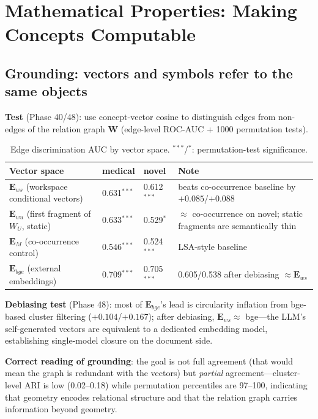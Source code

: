 \section{Mathematical Properties: Making Concepts Computable}
\label{sec:math}

\subsection{Grounding: vectors and symbols refer to the same objects}
\label{sec:math:grounding}

\textbf{Test} (Phase 40/48): use concept-vector cosine to distinguish edges
from non-edges of the relation graph $\mathbf{W}$ (edge-level ROC-AUC + 1000
permutation tests).

\begin{table}[t]
\centering
\caption{Edge discrimination AUC by vector space. $^{***}$/$^{*}$: permutation-test significance.}
\label{tab:grounding}
\begin{tabular}{@{}llll@{}}
\toprule
Vector space & medical & novel & Note \\
\midrule
$\mathbf{E}_{ws}$ (workspace conditional vectors) & 0.631$^{***}$ & 0.612$^{***}$ & beats co-occurrence baseline by $+0.085$/$+0.088$ \\
$\mathbf{E}_{wu}$ (first fragment of $W_U$, static) & 0.633$^{***}$ & 0.529$^{*}$ & $\approx$ co-occurrence on novel; static fragments are semantically thin \\
$\mathbf{E}_{M}$ (co-occurrence control) & 0.546$^{***}$ & 0.524$^{***}$ & LSA-style baseline \\
$\mathbf{E}_{bge}$ (external embeddings) & 0.709$^{***}$ & 0.705$^{***}$ & 0.605/0.538 after debiasing $\approx \mathbf{E}_{ws}$ \\
\bottomrule
\end{tabular}
\end{table}

\textbf{Debiasing test} (Phase 48): most of $\mathbf{E}_{bge}$'s lead is
circularity inflation from bge-based cluster filtering ($+0.104$/$+0.167$);
after debiasing, $\mathbf{E}_{ws} \approx$ bge---the LLM's self-generated
vectors are equivalent to a dedicated embedding model, establishing single-model
closure on the document side.

\textbf{Correct reading of grounding}: the goal is not full agreement (that
would mean the graph is redundant with the vectors) but \emph{partial}
agreement---cluster-level ARI is low (0.02--0.18) while permutation
percentiles are 97--100, indicating that geometry encodes relational structure
and that the relation graph carries information beyond geometry.

